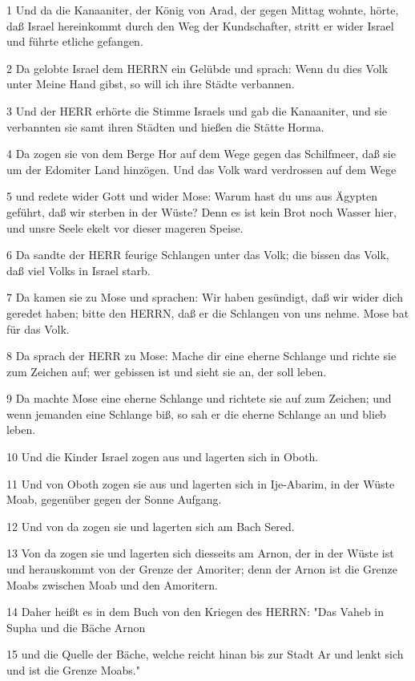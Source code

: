 \par 1 Und da die Kanaaniter, der König von Arad, der gegen Mittag wohnte, hörte, daß Israel hereinkommt durch den Weg der Kundschafter, stritt er wider Israel und führte etliche gefangen.
\par 2 Da gelobte Israel dem HERRN ein Gelübde und sprach: Wenn du dies Volk unter Meine Hand gibst, so will ich ihre Städte verbannen.
\par 3 Und der HERR erhörte die Stimme Israels und gab die Kanaaniter, und sie verbannten sie samt ihren Städten und hießen die Stätte Horma.
\par 4 Da zogen sie von dem Berge Hor auf dem Wege gegen das Schilfmeer, daß sie um der Edomiter Land hinzögen. Und das Volk ward verdrossen auf dem Wege
\par 5 und redete wider Gott und wider Mose: Warum hast du uns aus Ägypten geführt, daß wir sterben in der Wüste? Denn es ist kein Brot noch Wasser hier, und unsre Seele ekelt vor dieser mageren Speise.
\par 6 Da sandte der HERR feurige Schlangen unter das Volk; die bissen das Volk, daß viel Volks in Israel starb.
\par 7 Da kamen sie zu Mose und sprachen: Wir haben gesündigt, daß wir wider dich geredet haben; bitte den HERRN, daß er die Schlangen von uns nehme. Mose bat für das Volk.
\par 8 Da sprach der HERR zu Mose: Mache dir eine eherne Schlange und richte sie zum Zeichen auf; wer gebissen ist und sieht sie an, der soll leben.
\par 9 Da machte Mose eine eherne Schlange und richtete sie auf zum Zeichen; und wenn jemanden eine Schlange biß, so sah er die eherne Schlange an und blieb leben.
\par 10 Und die Kinder Israel zogen aus und lagerten sich in Oboth.
\par 11 Und von Oboth zogen sie aus und lagerten sich in Ije-Abarim, in der Wüste Moab, gegenüber gegen der Sonne Aufgang.
\par 12 Und von da zogen sie und lagerten sich am Bach Sered.
\par 13 Von da zogen sie und lagerten sich diesseits am Arnon, der in der Wüste ist und herauskommt von der Grenze der Amoriter; denn der Arnon ist die Grenze Moabs zwischen Moab und den Amoritern.
\par 14 Daher heißt es in dem Buch von den Kriegen des HERRN: "Das Vaheb in Supha und die Bäche Arnon
\par 15 und die Quelle der Bäche, welche reicht hinan bis zur Stadt Ar und lenkt sich und ist die Grenze Moabs."

